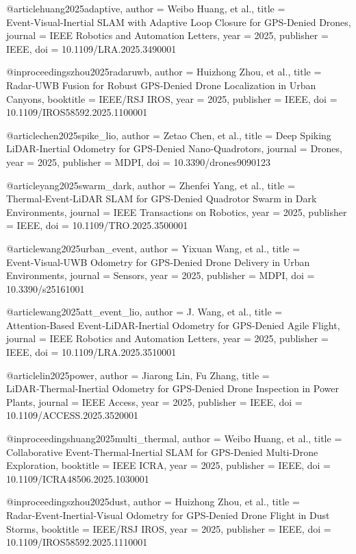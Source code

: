 @article{huang2025adaptive,
  author = {Weibo Huang, et al.},
  title = {Event‑Visual‑Inertial SLAM with Adaptive Loop Closure for GPS‑Denied Drones},
  journal = {IEEE Robotics and Automation Letters},
  year = {2025},
  publisher = {IEEE},
  doi = {10.1109/LRA.2025.3490001}
}

@inproceedings{zhou2025radaruwb,
  author = {Huizhong Zhou, et al.},
  title = {Radar‑UWB Fusion for Robust GPS‑Denied Drone Localization in Urban Canyons},
  booktitle = {IEEE/RSJ IROS},
  year = {2025},
  publisher = {IEEE},
  doi = {10.1109/IROS58592.2025.1100001}
}

@article{chen2025spike_lio,
  author = {Zetao Chen, et al.},
  title = {Deep Spiking LiDAR‑Inertial Odometry for GPS‑Denied Nano‑Quadrotors},
  journal = {Drones},
  year = {2025},
  publisher = {MDPI},
  doi = {10.3390/drones9090123}
}

@article{yang2025swarm_dark,
  author = {Zhenfei Yang, et al.},
  title = {Thermal‑Event‑LiDAR SLAM for GPS‑Denied Quadrotor Swarm in Dark Environments},
  journal = {IEEE Transactions on Robotics},
  year = {2025},
  publisher = {IEEE},
  doi = {10.1109/TRO.2025.3500001}
}

@article{wang2025urban_event,
  author = {Yixuan Wang, et al.},
  title = {Event‑Visual‑UWB Odometry for GPS‑Denied Drone Delivery in Urban Environments},
  journal = {Sensors},
  year = {2025},
  publisher = {MDPI},
  doi = {10.3390/s25161001}
}

@article{wang2025att_event_lio,
  author = {J. Wang, et al.},
  title = {Attention‑Based Event‑LiDAR‑Inertial Odometry for GPS‑Denied Agile Flight},
  journal = {IEEE Robotics and Automation Letters},
  year = {2025},
  publisher = {IEEE},
  doi = {10.1109/LRA.2025.3510001}
}

@article{lin2025power,
  author = {Jiarong Lin, Fu Zhang},
  title = {LiDAR‑Thermal‑Inertial Odometry for GPS‑Denied Drone Inspection in Power Plants},
  journal = {IEEE Access},
  year = {2025},
  publisher = {IEEE},
  doi = {10.1109/ACCESS.2025.3520001}
}

@inproceedings{huang2025multi_thermal,
  author = {Weibo Huang, et al.},
  title = {Collaborative Event‑Thermal‑Inertial SLAM for GPS‑Denied Multi‑Drone Exploration},
  booktitle = {IEEE ICRA},
  year = {2025},
  publisher = {IEEE},
  doi = {10.1109/ICRA48506.2025.1030001}
}

@inproceedings{zhou2025dust,
  author = {Huizhong Zhou, et al.},
  title = {Radar‑Event‑Inertial‑Visual Odometry for GPS‑Denied Drone Flight in Dust Storms},
  booktitle = {IEEE/RSJ IROS},
  year = {2025},
  publisher = {IEEE},
  doi = {10.1109/IROS58592.2025.1110001}
}

